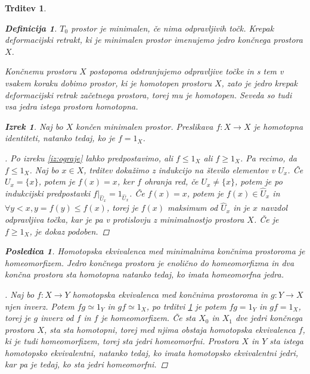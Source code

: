 \documentclass[a4paper,12pt]{article}
\theoremstyle{definition}
\newtheorem{definicija}{Definicija}
\theoremstyle{plain}
\newtheorem{izrek}{Izrek}
\theoremstyle{definition}
\theoremstyle{plain}
\newtheorem{trditev}{Trditev}
\theoremstyle{plain}
\newtheorem{posledica}{Posledica}
\theoremstyle{plain}
\theoremstyle{plain}
\newenvironment{dokaz}{\begin{proof}[\bfseries\upshape\proofname]}{\end{proof}}
\begin{document}
\begin{trditev}
\begin{definicija}
    $T_0$ prostor je \textit{minimalen}, če nima odpravljivih točk. Krepak deformacijski retrakt, ki je minimalen prostor imenujemo \textit{jedro} končnega prostora $X$.
\end{definicija}

Končnemu prostoru $X$ postopoma odstranjujemo odpravljive točke in s tem v vsakem koraku dobimo prostor, ki je homotopen prostoru $X$, zato je jedro krepak deformacijski retrak začetnega prostora, torej mu je homotopen. Seveda so tudi vsa jedra istega prostora homotopna.

\begin{izrek}
    \label{iz:identiteta}
    Naj bo $X$ končen minimalen prostor. Preslikava $f:X\rightarrow X$ je homotopna identiteti, natanko tedaj, ko je $f=1_X$.
\end{izrek}

\begin{dokaz}
    Po izreku \ref{iz:ograje} lahko predpostavimo, ali 
    $f\leq 1_X$ ali $f\geq 1_X$. %
    Pa recimo, da $f\leq 1_X$. 
    Naj bo $x\in X$, trditev dokažimo z indukcijo na 
    število elementov v $U_x$. Če $U_x=\{x\}$, potem je 
    $f(x)=x$, ker $f$ ohranja red, če $U_x\neq\{x\}$, potem 
    je po indukcijski predpostavki 
    $f|_{\hat{U}_x}=1_{\hat{U}_x}$. Če $f(x)=x$, potem je 
    $f(x)\in \hat{U}_x$ in $\forall y < x, y=f(y)\leq 
    f(x)$, torej je $f(x)$ maksimum od $\hat{U}_x$ in je 
    $x$ navzdol odpravljiva točka, kar je pa v protislovju 
    z minimalnostjo prostora $X$. Če je $f\geq 1_X$, je 
    dokaz podoben.
\end{dokaz}

\begin{posledica}
    Homotopska ekvivalenca med minimalnima končnima prostoroma je homeomorfizem. Jedro končnega prostora je enolično do homeomorfizma in dva končna prostora sta homotopna natanko tedaj, ko imata homeomorfna jedra.
\end{posledica}

\begin{dokaz}
    Naj bo $f:X\rightarrow Y$ homotopska ekvivalenca med 
    končnima prostoroma in $g:Y\rightarrow X$ njen inverz. 
    Potem $fg\simeq 1_Y$ in $gf \simeq 1_X$, po trditvi 
    \ref{iz:identiteta} je potem $fg = 1_Y$ in $gf = 1_X$,
    torej je $g$ inverz od $f$ in $f$ je homeomorfizem. Če 
    sta $X_0$ in $X_1$ dve jedri končnega prostora $X$, sta 
    sta homotopni, torej med njima obstaja homotopska ekvivalenca $f$, 
    ki je tudi homeomorfizem, torej sta jedri homeomorfni. 
    Prostora $X$ in $Y$ sta istega homotopsko ekvivalentni, 
    natanko tedaj, ko imata homotopsko ekvivalentni jedri, 
    kar pa je tedaj, ko sta jedri homeomorfni.
\end{dokaz}



\end{trditev}
\end{document}
